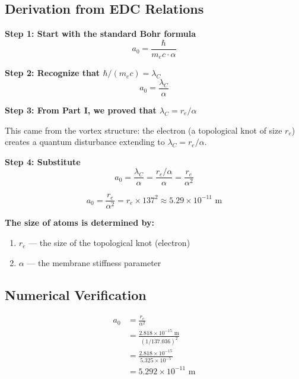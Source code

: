 \subsection{Derivation from EDC Relations}
\label{subsec:derivation}

\textbf{Step 1: Start with the standard Bohr formula}
\begin{equation}
a_0 = \frac{\hbar}{m_e c \cdot \alpha}
\end{equation}

\textbf{Step 2: Recognize that $\hbar/(m_e c) = \lambda_C$}
\begin{equation}
a_0 = \frac{\lambda_C}{\alpha}
\end{equation}

\textbf{Step 3: From Part I, we proved that $\lambda_C = r_e/\alpha$}

This came from the vortex structure: the electron (a topological knot of size $r_e$) creates a quantum disturbance extending to $\lambda_C = r_e/\alpha$.

\textbf{Step 4: Substitute}
\begin{equation}
a_0 = \frac{\lambda_C}{\alpha} = \frac{r_e/\alpha}{\alpha} = \frac{r_e}{\alpha^2}
\end{equation}

\begin{tcolorbox}[colback=green!5,colframe=green!70!black,title=\textbf{Result: Bohr Radius from Geometry}]
\begin{equation}
\boxed{a_0 = \frac{r_e}{\alpha^2} = r_e \times 137^2 \approx 5.29 \times 10^{-11} \text{ m}}
\label{eq:bohr_edc}
\end{equation}

\textbf{The size of atoms is determined by:}
\begin{enumerate}
    \item $r_e$ --- the size of the topological knot (electron)
    \item $\alpha$ --- the membrane stiffness parameter
\end{enumerate}
\end{tcolorbox}

\subsection{Numerical Verification}
\label{subsec:numerical_verification}

\begin{align}
a_0 &= \frac{r_e}{\alpha^2} \\
&= \frac{2.818 \times 10^{-15} \text{ m}}{(1/137.036)^2} \\
&= \frac{2.818 \times 10^{-15}}{5.325 \times 10^{-5}} \\
&= 5.292 \times 10^{-11} \text{ m}
\end{align}

